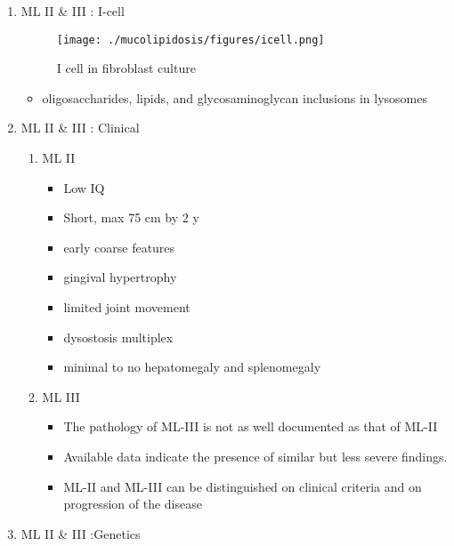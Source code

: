 \documentclass{scrartcl}
\begin{document}
\begin{enumerate}
\item ML II \& III : I-cell
\label{sec:org2e9397a}

\begin{figure}[htbp]
\centering
\texttt{[image: ./mucolipidosis/figures/icell.png]}
\caption{\label{fig:org98fb20e}
I cell in fibroblast culture}
\end{figure}

\begin{itemize}
\item oligosaccharides, lipids, and glycosaminoglycan inclusions in lysosomes
\end{itemize}

\item ML II \& III : Clinical
\label{sec:org981d84e}

\begin{enumerate}
\item ML II
\label{sec:org77def50}
\begin{itemize}
\item Low IQ
\item Short, max 75 cm by 2 y
\item early coarse features
\item gingival hypertrophy
\item limited joint movement
\item dysostosis multiplex
\item minimal to no hepatomegaly and splenomegaly
\end{itemize}

\item ML III
\label{sec:org787c76f}
\begin{itemize}
\item The pathology of ML-III is not as well documented as that of ML-II
\item Available data indicate the presence of similar but less severe
findings.

\item ML-II and ML-III can be distinguished on clinical criteria and on progression of the disease
\end{itemize}
\end{enumerate}

\item ML II \& III :Genetics
\label{sec:orgf4dbb81}


\end{enumerate}
\end{document}
